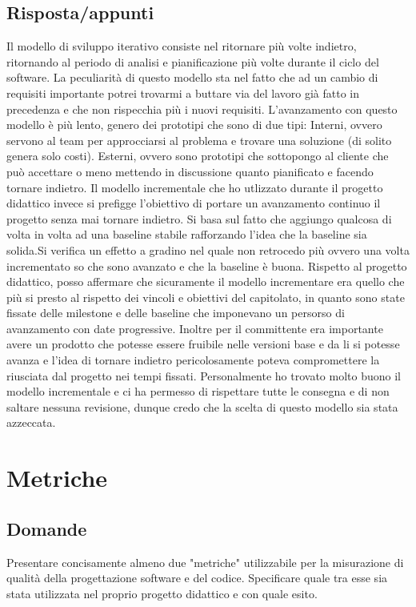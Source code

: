 \subsection*{Risposta/appunti}
Il modello di sviluppo iterativo consiste nel ritornare più volte indietro, ritornando al periodo di analisi e pianificazione
più volte durante il ciclo del software. La peculiarità di questo modello sta nel fatto che ad un cambio di requisiti
importante potrei trovarmi a buttare via del lavoro già fatto in precedenza e che non rispecchia più i nuovi requisiti.
L'avanzamento con questo modello è più lento, genero dei prototipi che sono di due tipi:
Interni, ovvero servono al team per approcciarsi al problema e trovare una soluzione (di solito genera solo costi).
Esterni, ovvero sono prototipi che sottopongo al cliente che può accettare o meno mettendo in discussione quanto
pianificato e facendo tornare indietro.
Il modello incrementale che ho utlizzato durante il progetto didattico invece si prefigge l'obiettivo di portare un
avanzamento continuo il progetto senza mai tornare indietro.
Si basa sul fatto che aggiungo qualcosa di volta in volta ad una baseline stabile rafforzando l'idea che la baseline sia
solida.Si verifica un effetto a gradino nel quale non retrocedo più ovvero una volta incrementato so che sono avanzato e
che la baseline è buona.
Rispetto al progetto didattico, posso affermare che sicuramente il modello incrementare era quello che più si presto al
rispetto dei vincoli e obiettivi del capitolato, in quanto sono state fissate delle milestone e delle baseline che
imponevano un persorso di avanzamento con date progressive. Inoltre per il committente era importante avere un
prodotto che potesse essere fruibile nelle versioni base e da li si potesse avanza e l'idea di tornare indietro
pericolosamente poteva compromettere la riusciata dal progetto nei tempi fissati.
Personalmente ho trovato molto buono il modello incrementale e ci ha permesso di rispettare tutte le consegna e di non
saltare nessuna revisione, dunque credo che la scelta di questo modello sia stata azzeccata.

\section{Metriche}

\subsection*{Domande}
Presentare concisamente almeno due "metriche" utilizzabile per la misurazione di qualità della progettazione software e del codice.
Specificare quale tra esse sia stata utilizzata nel proprio progetto didattico e con quale esito. \\

